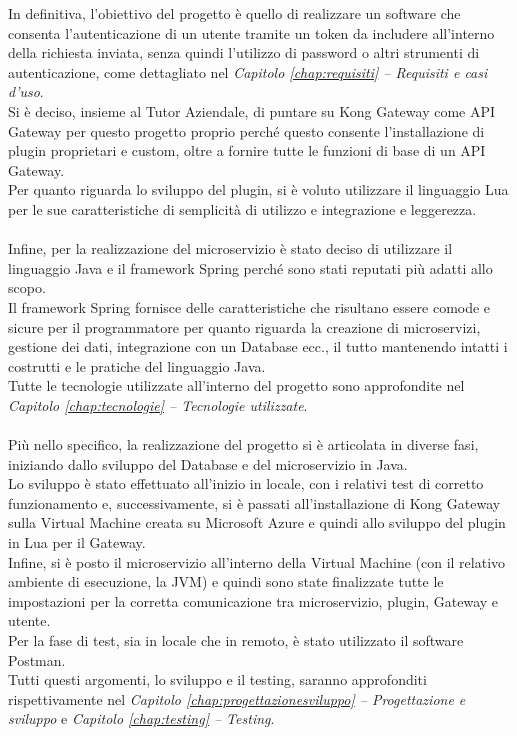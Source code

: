In definitiva, l'obiettivo del progetto è quello di realizzare un software che consenta l'autenticazione di un utente tramite un token da includere all'interno della 
richiesta inviata, senza quindi l'utilizzo di password o altri strumenti di autenticazione, come dettagliato nel \emph{Capitolo \ref{chap:requisiti} – Requisiti e casi d'uso}. \\

Si è deciso, insieme al Tutor Aziendale, di puntare su Kong Gateway come API Gateway per questo progetto proprio perché questo consente l'installazione di plugin 
proprietari e custom, oltre a fornire tutte le funzioni di base di un API Gateway.\\
Per quanto riguarda lo sviluppo del plugin, si è voluto utilizzare il linguaggio Lua per le sue caratteristiche di semplicità di utilizzo e integrazione e leggerezza.\\ \\

Infine, per la realizzazione del microservizio è stato deciso di utilizzare il linguaggio Java e il framework Spring perché sono stati reputati più adatti allo scopo.\\
Il framework Spring fornisce delle caratteristiche che risultano essere comode e sicure per il programmatore per quanto riguarda la creazione di microservizi, 
gestione dei dati, integrazione con un Database ecc., il tutto mantenendo intatti i costrutti e le pratiche del linguaggio Java.\\
Tutte le tecnologie utilizzate all'interno del progetto sono approfondite nel \emph{Capitolo \ref{chap:tecnologie} – Tecnologie utilizzate}.\\ \\

Più nello specifico, la realizzazione del progetto si è articolata in diverse fasi, iniziando dallo sviluppo del Database e del microservizio in Java.\\
Lo sviluppo è stato effettuato all'inizio in locale, con i relativi test di corretto funzionamento e, successivamente, si è passati all'installazione di Kong Gateway
sulla Virtual Machine creata su Microsoft Azure e quindi allo sviluppo del plugin in Lua per il Gateway.\\
Infine, si è posto il microservizio all'interno della Virtual Machine (con il relativo ambiente di esecuzione, la JVM) e quindi sono state finalizzate tutte le 
impostazioni per la corretta comunicazione tra microservizio, plugin, Gateway e utente.\\
Per la fase di test, sia in locale che in remoto, è stato utilizzato il software Postman.\\
Tutti questi argomenti, lo sviluppo e il testing, saranno approfonditi rispettivamente nel \emph{Capitolo \ref{chap:progettazionesviluppo} – Progettazione e sviluppo} 
e \emph{Capitolo \ref{chap:testing} – Testing}.

